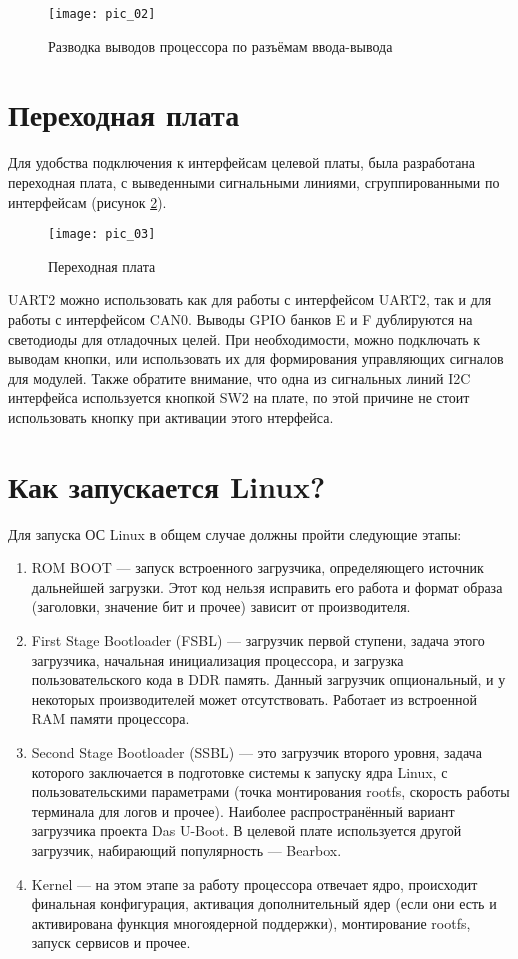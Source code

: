 \begin{figure}
	\centering\texttt{[image: pic\_02]}
	\caption{Разводка выводов процессора по разъёмам ввода-вывода}
	\label{fig:fig2}
\end{figure}

\section*{Переходная плата}
Для удобства подключения к интерфейсам целевой платы, была разработана переходная плата, с выведенными сигнальными линиями, сгруппированными по интерфейсам (рисунок \ref{fig:fig3}).  

\begin{figure}[hbt!]
	\centering\texttt{[image: pic\_03]}
	\caption{Переходная плата}
	\label{fig:fig3}
\end{figure}

UART2 можно использовать как для работы с интерфейсом UART2, так и для работы с интерфейсом CAN0. Выводы GPIO банков E и F дублируются на светодиоды для отладочных целей. При необходимости, можно подключать к выводам кнопки, или использовать их для формирования управляющих сигналов для модулей. Также обратите внимание, что одна из сигнальных линий I2C интерфейса используется кнопкой SW2 на плате, по этой причине не стоит использовать кнопку при активации этого нтерфейса.    


\section*{Как запускается Linux?}
Для запуска ОС Linux в общем случае должны пройти следующие этапы:
\begin{enumerate}
	\item  ROM BOOT — запуск встроенного загрузчика, определяющего источник дальнейшей загрузки. Этот код нельзя исправить его работа и формат образа (заголовки, значение бит и прочее) зависит от производителя.
	
	\item First Stage Bootloader (FSBL) — загрузчик первой ступени, задача этого загрузчика, начальная инициализация процессора, и загрузка пользовательского кода в DDR память. Данный загрузчик опциональный, и у некоторых производителей может отсутствовать. Работает из встроенной RAM памяти процессора.
	
	\item Second Stage Bootloader (SSBL) — это загрузчик второго уровня, задача которого заключается в подготовке системы к запуску ядра Linux, с пользовательскими параметрами (точка монтирования rootfs, скорость работы терминала для логов и прочее). Наиболее распространённый вариант загрузчика проекта Das U-Boot. В целевой плате используется другой загрузчик, набирающий популярность — Bearbox.
	
	\item Kernel — на этом этапе за работу процессора отвечает ядро, происходит финальная конфигурация, активация дополнительный ядер (если они есть и активирована функция многоядерной поддержки), монтирование rootfs, запуск сервисов и прочее.
\end{enumerate}


